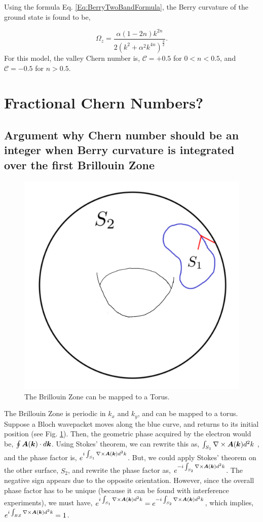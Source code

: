\documentclass{report}
\renewcommand\vec[1]{\ensuremath\boldsymbol{#1}} %
\begin{document}
Using the formula Eq. \eqref{Eq:BerryTwoBandFormula}, the Berry curvature of the ground state is found to be,

$$\Omega_z = \frac{\alpha (1 - 2n) k^{2n}}{2(k^2 + \alpha^2 k^{4n})^{\frac{3}{2}}}.$$
For this model, the valley Chern number is, $\mathcal{C} = +0.5$ for $0<n<0.5$, and $\mathcal{C} = -0.5$ for $n>0.5$.
\section{Fractional Chern Numbers?}
\subsection{Argument why Chern number should be an integer when Berry curvature is integrated over the first Brillouin Zone}\label{sebsec:integer-chern-argument}

\begin{figure}[h!]
	\centering
	\includegraphics[width=0.3\linewidth]{torus}
	\caption{The Brillouin Zone can be mapped to a Torus.}
	\label{fig:torus}
\end{figure}
The Brillouin Zone is periodic in $k_x$ and $k_y$, and can be mapped to a torus. Suppose a Bloch wavepacket moves along the blue curve, and returns to its initial position (see Fig. \ref{fig:torus}). Then, the geometric phase acquired by the electron would be, $\oint \vec{A}(\vec{k})\cdot d\vec{k}$. Using Stokes' theorem, we can rewrite this as, $\int_{S_1} \nabla \times \vec{A}(\vec{k}) d^2 k$ , and the phase factor is, $e^{i\int_{S_1} \nabla \times \vec{A}(\vec{k}) d^2 k}$. But, we could apply Stokes' theorem on the other surface, $S_2$, and rewrite the phase factor as, $e^{-i\int_{S_2} \nabla \times \vec{A}(\vec{k}) d^2 k}$. The negative sign appears due to the opposite orientation.
However, since the overall phase factor has to be unique (because it can be found with interference experiments), we must have, $e^{i\int_{S_1} \nabla \times \vec{A}(\vec{k}) d^2 k} = e^{-i\int_{S_2} \nabla \times \vec{A}(\vec{k}) d^2 k}$, which implies, $e^{i\int_{B Z} \nabla \times \vec{A}(\vec{k}) d^2 k} = 1$.
\end{document}
